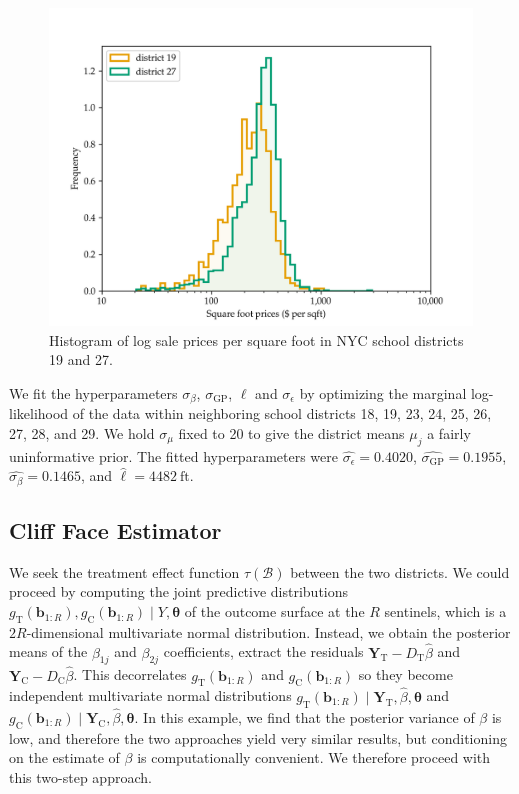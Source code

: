 \documentclass[letter]{article}
\makeatletter
\def\maxwidth{\ifdim\Gin@nat@width>\linewidth\linewidth
\else\Gin@nat@width\fi}
\let\Oldincludegraphics\includegraphics
\renewcommand{\includegraphics}[1]{\Oldincludegraphics[width=0.9\maxwidth]{#1}}
\newcommand{\treat}{\mathrm{T}}
\newcommand{\ctrol}{\mathrm{C}}
\newcommand{\sigmaf}{\sigma_{\mathrm{GP}}}
\newcommand{\sigman}{\sigma_{\epsilon}}
\newcommand{\sigmamu}{\sigma_{\mu}}
\newcommand{\Yvec}{\mathbold{Y}}
\newcommand{\yt}{\Yvec_{\treat}}
\newcommand{\yc}{\Yvec_{\ctrol}}
\newcommand{\border}{\mathcal{B}}
\newcommand{\sentinel}{\bm{b}}
\newcommand{\numsent}{R}
\newcommand{\sentinels}{\sentinel_{1:\numsent}}
\newcommand{\hyperparam}{\bm{\theta}}
\makeatother
\begin{document}
\begin{figure}
\centering
\includegraphics{../NYC/NYC_plots/sales_histogram_19-27.png}
\caption{\label{fig:NYC_histogram}Histogram of log sale prices per square foot in NYC school districts 19 and 27.}
\end{figure}
    


    	We fit the hyperparameters \(\sigma_\beta\), \(\sigmaf\), \(\ell\) and \(\sigman\) by optimizing the marginal log-likelihood of the data within neighboring school districts 18, 19, 23, 24, 25, 26, 27, 28, and 29.
We hold \(\sigmamu\) fixed to 20 to give the district means \(\mu_j\) a fairly uninformative prior.
The fitted hyperparameters were \(\widehat{\sigman}=0.4020\), \(\widehat{\sigmaf}=0.1955\), \(\widehat{\sigma_\beta}=0.1465\), and \(\widehat{\ell}=4482~\text{ft}\).
    


    	\subsection{Cliff Face Estimator}\label{cliff-face-estimator}
    


    	We seek the treatment effect function \(\tau(\border)\) between the two districts. We could proceed by computing the joint predictive distributions \(g_\treat{}(\sentinels),g_\ctrol{}(\sentinels) \mid Y, \hyperparam\) of the outcome surface at the \(\numsent\) sentinels, which is a \(2 \numsent\)-dimensional multivariate normal distribution.
Instead, we obtain the posterior means of the \(\beta_{1j}\) and \(\beta_{2j}\) coefficients, extract the residuals \(\yt{}-D_\treat{} \hat{\beta}\) and \(\yc{}-D_\ctrol{} \hat{\beta}\).
This decorrelates \(g_\treat{}(\sentinels)\) and \(g_\ctrol{}(\sentinels)\) so they become independent multivariate normal distributions \(g_\treat{}(\sentinels) \mid \yt{}, \hat\beta, \hyperparam\) and \(g_\ctrol{}(\sentinels) \mid \yc{}, \hat\beta, \hyperparam\).
In this example, we find that the posterior variance of \(\beta\) is low, and therefore the two approaches yield very similar results, but conditioning on the estimate of \(\beta\) is computationally convenient. We therefore proceed with this two-step approach.
    
\end{document}
